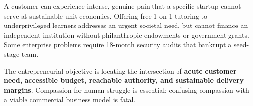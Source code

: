 A customer can experience intense, genuine pain that a specific startup cannot serve at sustainable unit economics. Offering free 1-on-1 tutoring to underprivileged learners addresses an urgent societal need, but cannot finance an independent institution without philanthropic endowments or government grants. Some enterprise problems require 18-month security audits that bankrupt a seed-stage team.

The entrepreneurial objective is locating the intersection of \textbf{acute customer need, accessible budget, reachable authority, and sustainable delivery margins}. Compassion for human struggle is essential; confusing compassion with a viable commercial business model is fatal.
